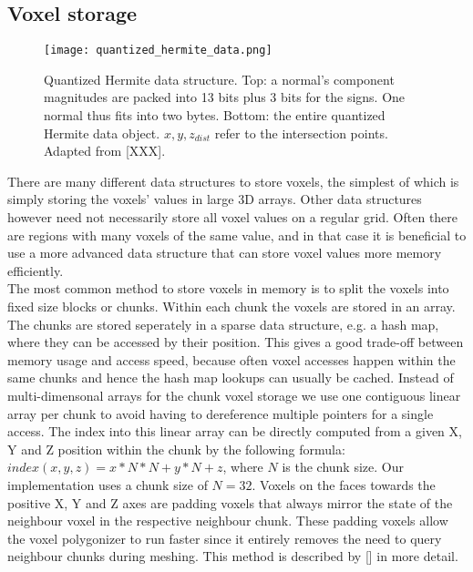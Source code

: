 \subsection{Voxel storage}

\begin{wrapfigure}{R}{0.5\textwidth}
\texttt{[image: quantized\_hermite\_data.png]}
\caption{Quantized Hermite data structure. Top: a normal's component magnitudes are packed into 13 bits plus 3 bits for the signs. One normal thus fits into two bytes. Bottom: the entire quantized Hermite data object. $x,y,z_{dist}$ refer to the intersection points. Adapted from [XXX].}
\label{fig:quantized_hermite_data}
\end{wrapfigure}

There are many different data structures to store voxels, the simplest of which is simply storing the voxels' values in large 3D arrays.
Other data structures however need not necessarily store all voxel values on a regular grid. Often there are regions with many voxels of the same value, and
in that case it is beneficial to use a more advanced data structure that can store voxel values more memory efficiently.\\
The most common method to store voxels in memory is to split the voxels into fixed size blocks or chunks. Within each chunk the voxels are stored in an array. The chunks are stored seperately in a sparse data structure, e.g. a hash map,
where they can be accessed by their position. This gives a good trade-off between memory usage and access speed, because often voxel accesses happen within the same chunks and hence the hash map lookups can usually be cached. Instead of multi-dimensonal arrays for the chunk voxel storage we use one contiguous linear array per chunk to avoid having to dereference multiple pointers for a single access. The index into this linear array can be directly computed from a given X, Y and Z position within the chunk by the following formula: $index(x, y, z) = x * N * N + y * N + z$, where $N$ is the chunk size.
Our implementation uses a chunk size of $N=32$. Voxels on the faces towards the positive X, Y and Z axes are padding voxels that always mirror the state of the neighbour voxel in the respective neighbour chunk.
These padding voxels allow the voxel polygonizer to run faster since it entirely removes the need to query neighbour chunks during meshing. This method is described by [] in more detail. \\
